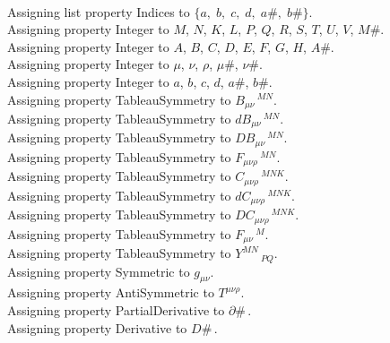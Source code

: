 \documentclass[11pt]{article}
\begin{document}
\\
Assigning list property Indices to $\{a,\; b,\; c,\; d,\; a\#,\; b\#\}$.
\\
Assigning property Integer to $M$, $N$, $K$, $L$, $P$, $Q$, $R$, $S$, $T$, $U$, $V$, $M\#$.
\\
Assigning property Integer to $A$, $B$, $C$, $D$, $E$, $F$, $G$, $H$, $A\#$.
\\
Assigning property Integer to $\mu$, $\nu$, $\rho$, $\mu\#$, $\nu\#$.
\\
Assigning property Integer to $a$, $b$, $c$, $d$, $a\#$, $b\#$.
\\
Assigning property TableauSymmetry to ${B}_{\mu \nu}\,^{M N}$.
\\
Assigning property TableauSymmetry to ${dB}_{\mu \nu}\,^{M N}$.
\\
Assigning property TableauSymmetry to ${DB}_{\mu \nu}\,^{M N}$.
\\
Assigning property TableauSymmetry to ${F}_{\mu \nu \rho}\,^{M N}$.
\\
Assigning property TableauSymmetry to ${C}_{\mu \nu \rho}\,^{M N K}$.
\\
Assigning property TableauSymmetry to ${dC}_{\mu \nu \rho}\,^{M N K}$.
\\
Assigning property TableauSymmetry to ${DC}_{\mu \nu \rho}\,^{M N K}$.
\\
Assigning property TableauSymmetry to ${F}_{\mu \nu}\,^{M}$.
\\
Assigning property TableauSymmetry to ${Y}^{M N}\,_{P Q}$.
\\
Assigning property Symmetric to ${g}_{\mu \nu}$.
\\
Assigning property AntiSymmetric to ${T}^{\mu \nu \rho}$.
\\
Assigning property PartialDerivative to $\partial{\#}\, $.
\\
Assigning property Derivative to $D{\#}\, $.
\end{document}
